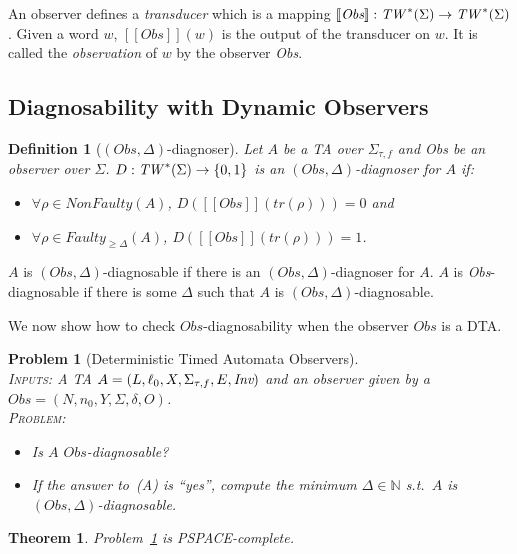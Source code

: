 \documentclass[letterpaper,10pt,conference]{ieeeconf}  \IEEEoverridecommandlockouts                              \overrideIEEEmargins
\def\st{{s.t.}~}
\def\trace{\textit{tr}}
\def\faulty{\textit{Faulty}}
\def\nonfaulty{\textit{NonFaulty}}
\newtheorem{prob}{Problem}  \newtheorem{definition}{Definition}
\newtheorem{theorem}{Theorem}
\newcommand{\sem}[1]{[\![#1]\!]}
\newcommand{\setN}{\mathbb N}
\def\endef{\ifmmode\squareforged\else{\unskip\nobreak\hfil
\penalty50\hskip1em\null\nobreak\hfil$\blacksquare$
\parfillskip=0pt\finalhyphendemerits=0\endgraf}\fi}
\def\tauac{\tau}
\def\tw{\textit{TW\/}}
\def\obs{\textit{Obs}\xspace}
\begin{document}
\noindent An observer defines a {\em transducer} which is a mapping
$\sem{\obs} : \tw^*(\Sigma)\rightarrow \tw^*(\Sigma)$. Given a word
$w$, $\sem{\obs}(w)$ is the out\-put of the transducer on $w$.  It is
called the \emph{observation} of $w$ by the observer \obs.

\subsection{Diagnosability with Dynamic Observers}
\begin{definition}[$(\obs,\Delta)$-diagnoser] \label{def-obsk-diag}
  Let $A$ be a TA over $\Sigma_{\tauac,f}$ and \obs be an observer
  over $\Sigma$. $D:\tw^*(\Sigma) \rightarrow \{0,1\}$ is an
  \emph{$(\obs,\Delta)$-diagnoser} for $A$ if:
  \begin{itemize}
  \item $\forall \rho \in \nonfaulty(A)$,
    $D(\sem{\obs}(\trace(\rho)))=0$ and
  \item $\forall \rho \in \faulty_{\geq \Delta}(A)$,
    $D(\sem{\obs}(\trace(\rho)))=1$. \endef
  \end{itemize}
\end{definition}
$A$ is $(\obs,\Delta)$-diagnosable if there is an
$(\obs,\Delta)$-diagnoser for $A$. $A$ is \obs-diagnosable if there is
some $\Delta$ such that $A$ is $(\obs,\Delta)$-diagnosable.

We now show how to check $\obs$-diagnosability when the observer
$\obs$ is a DTA.
\begin{prob}[Deterministic Timed Automata Observers] \label{prob-dynamic-ta} \mbox{} \\
  \textsc{Inputs:} A TA $A=(L,\ell_0,X,\Sigma_{\tauac,f},E,\inv)$ and
  an observer given by a \dta
  $\obs=(N,n_0,Y,\Sigma,\delta,O)$. \\
  \textsc{Problem:}
  \begin{itemize}
  \item[(A)] Is $A$ $\obs$-diagnosable?
  \item[(B)] If the answer to~(A) is ``yes'', compute the minimum $\Delta \in \setN$
    \st $A$ is $(\obs,\Delta)$-diagnosable.
  \end{itemize}
\end{prob}

\begin{theorem}
  Problem~\ref{prob-dynamic-ta} is PSPACE-complete.
\end{theorem}
\end{document}
